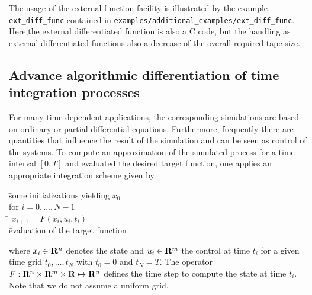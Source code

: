 \documentclass[11pt,twoside]{article}
\begin{document}
\noindent
\hspace*{2cm}{\sf int call\_ext\_fct(edf, n, xp, x, m, yp, y);}
\medskip

\noindent
The usage of the external function facility is illustrated by the
example \verb=ext_diff_func= contained in
\verb=examples/additional_examples/ext_diff_func=.
Here,the external differentiated function is also a C code, but the
handling as external differentiated functions also a decrease of the
overall required tape size.

%
\subsection{Advance algorithmic differentiation of time integration processes}
%
For many time-dependent applications, the corresponding simulations
are based on ordinary or partial differential equations.
Furthermore, frequently there are quantities that influence the
result of the simulation and can be seen as  control of the systems. 
To compute an approximation of the
simulated process for a time interval $[0,T]$ and evaluated the
desired target function, one applies an
appropriate integration scheme given by
\begin{tabbing}
\hspace{5mm} \= some initializations yielding $x_0$\\
\> for $i=0,\ldots, N-1$\\
\hspace{10mm}\= $x_{i+1} = F(x_i,u_i,t_i)$\\
\hspace{5mm} \= evaluation of the target function
\end{tabbing}
where $x_i\in {\bf R}^n$ denotes the state and $u_i\in {\bf R}^m$ the control at
time $t_i$ for a given time grid $t_0,\ldots,t_N$ with $t_0=0$ and
$t_N=T$. The operator $F : {\bf R}^n \times {\bf R}^m \times {\bf R} \mapsto {\bf R}^n$
defines the time step to compute the state at time $t_i$. Note that we
do not assume a uniform grid.
\end{document}

